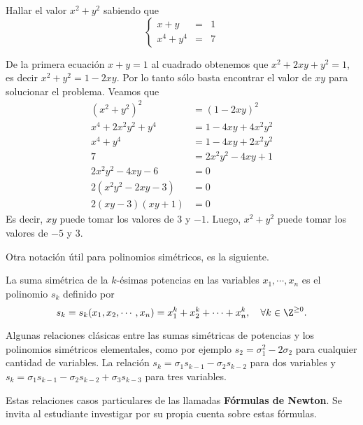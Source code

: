 \begin{section-example.tcb}
    Hallar el valor $x^2 + y^2$ sabiendo que
    \[
        \left\{
        \begin{array}{rcl}
            x + y & =& 1\\
            x^4 + y^4 & =& 7
        \end{array}
        \right.
    \]
\end{section-example.tcb}
\begin{solution}
    De la primera ecuación $x + y = 1$ al cuadrado obtenemos que $x^2 + 2xy + y^2 = 1$, es decir $x^2 + y^2 = 1 - 2xy$.
    Por lo tanto sólo basta encontrar el valor de $xy$ para solucionar el problema.
    Veamos que
    \begin{align*}
        (x^2 + y^2)^2 &= (1 - 2xy)^2 \\
        x^4 + 2x^2 y^2 + y^4 &= 1 - 4xy + 4x^2 y^2\\
        x^4 + y^4 &= 1 - 4xy + 2 x^2 y^2\\
        7 &= 2x^2 y^2 - 4xy + 1\\
        2x^2 y^2 - 4xy - 6 &= 0\\
        2(x^2 y^2 - 2xy - 3) &= 0\\
        2(xy - 3)(xy + 1) &= 0
    \end{align*}
    Es decir, $xy$ puede tomar los valores de $3$ y $-1$.
    Luego, $x^2 + y^2$ puede tomar los valores de $\boxed{-5}$ y $\boxed{3}$.
\end{solution}

Otra notación útil para polinomios simétricos, es la siguiente.

\begin{section-definition.tcb}
    La suma simétrica de la $k$-ésimas potencias en las variables $x_1, \cdots, x_n$ es el polinomio $s_k$ definido por
    \[s_k = s_k(x_1, x_2, \cdots, x_n) = x_1^k + x_2^k + \cdots + x_n^k, \quad \forall k \in \Z^{\geq 0}.\]
\end{section-definition.tcb}

Algunas relaciones clásicas entre las sumas simétricas de potencias y los polinomios simétricos elementales, como por ejemplo $\boxed{s_2 = \sigma_1^2 - 2\sigma_2}$ para cualquier cantidad de variables.
La relación $\boxed{s_k = \sigma_1 s_{k - 1} - \sigma_2 s_{k - 2}}$ para dos variables y $\boxed{s_k = \sigma_1 s_{k - 1} - \sigma_2 s_{k - 2} + \sigma_3 s_{k - 3}}$ para tres variables.

Estas relaciones casos particulares de las llamadas \textbf{Fórmulas de Newton}.
Se invita al estudiante investigar por su propia cuenta sobre estas fórmulas.



